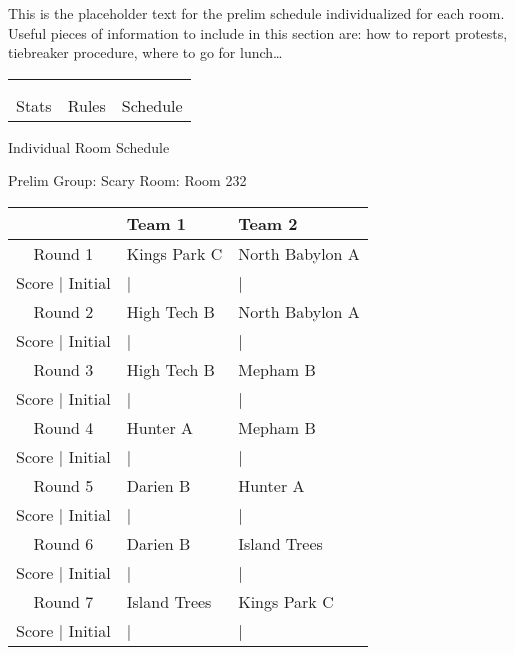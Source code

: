 \documentclass{article}%
\begin{document}
\vspace*{16pt}%
\linebreak%
This is the placeholder text for the prelim schedule individualized for each room. Useful pieces of information to include in this section are: how to report protests, tiebreaker procedure, where to go for lunch…%
\vspace*{30pt}%
\newline%
%
\begin{tabularx}{\textwidth}{YYY}%
  &  &  \\%
\\%
Stats&Rules&Schedule\\%
\end{tabularx}%
\newpage%
\begin{center}%
\begin{Huge}%
Individual Room Schedule%
\end{Huge}%
\vspace*{16pt}%
\linebreak%
\begin{Large}%
Prelim Group: Scary \hfill Room: Room 232%
\end{Large}%
\end{center}%
%
\begin{tabularx}{\textwidth}{|c|Y|Y|}%
\hline%
&Team 1&Team 2\\%
\hline%
Round 1&Kings Park C&North Babylon A\\%
\hline%
Score | Initial&|&|\\%
\hline%
Round 2&High Tech B&North Babylon A\\%
\hline%
Score | Initial&|&|\\%
\hline%
Round 3&High Tech B&Mepham B\\%
\hline%
Score | Initial&|&|\\%
\hline%
Round 4&Hunter A&Mepham B\\%
\hline%
Score | Initial&|&|\\%
\hline%
Round 5&Darien B&Hunter A\\%
\hline%
Score | Initial&|&|\\%
\hline%
Round 6&Darien B&Island Trees\\%
\hline%
Score | Initial&|&|\\%
\hline%
Round 7&Island Trees&Kings Park C\\%
\hline%
Score | Initial&|&|\\%
\hline%
\end{tabularx}%
\end{document}
